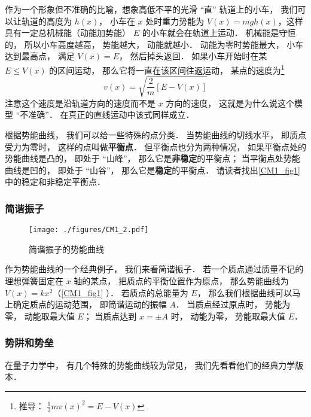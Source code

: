 作为一个形象但不准确的比喻，想象高低不平的光滑 “直” 轨道上的小车， 我们可以让轨道的高度为 $h(x)$， 小车在 $x$ 处时重力势能为 $V(x) = mgh(x)$，这样具有一定总机械能（动能加势能） $E$ 的小车就会在轨道上运动． 机械能是守恒的， 所以小车高度越高， 势能越大， 动能就越小． 动能为零时势能最大， 小车达到最高点， 满足 $V(x) = E$， 然后掉头返回． 如果小车开始时在某 $E \leq V(x)$ 的区间运动， 那么它将一直在该区间往返运动， 某点的速度为\footnote{推导： $\frac{1}{2}mv(x)^2 = E - V(x)$}
\begin{equation}\label{CM1_eq1}
v(x) = \sqrt{\frac{2}{m}[E - V(x)]}
\end{equation}
注意这个速度是沿轨道方向的速度而不是 $x$ 方向的速度， 这就是为什么说这个模型 “不准确”． 在真正的直线运动中该式同样成立．

根据势能曲线， 我们可以给一些特殊的点分类． 当势能曲线的切线水平， 即质点受力为零时， 这样的点叫做\textbf{平衡点}． 但平衡点也分为两种情况， 如果平衡点处的势能曲线是凸的， 即处于 “山峰”， 那么它是\textbf{非稳定}的平衡点； 当平衡点处势能曲线是凹的， 即处于 “山谷”， 那么它是\textbf{稳定}的平衡点． 请读者找出\autoref{CM1_fig1} 中的稳定和非稳定平衡点．


\subsubsection{简谐振子}

\begin{figure}[ht]
\centering
\texttt{[image: ./figures/CM1\_2.pdf]}
\caption{简谐振子的势能曲线} \label{CM1_fig2}
\end{figure}

作为势能曲线的一个经典例子， 我们来看简谐振子． 若一个质点通过质量不记的理想弹簧固定在 $x$ 轴的某点， 把质点的平衡位置作为原点， 那么势能曲线为 $V(x) = kx^2$（\autoref{CM1_fig1} ）． 若质点的总能量为 $E$， 那么我们根据曲线可以马上确定质点的运动范围， 即简谐运动的振幅 $A$． 当质点经过原点时， 势能为零， 动能取最大值 $E$； 当质点达到 $x = \pm A$ 时， 动能为零， 势能取最大值 $E$．


\subsubsection{势阱和势垒}
在量子力学中， 有几个特殊的势能曲线较为常见， 我们先看看他们的经典力学版本．

